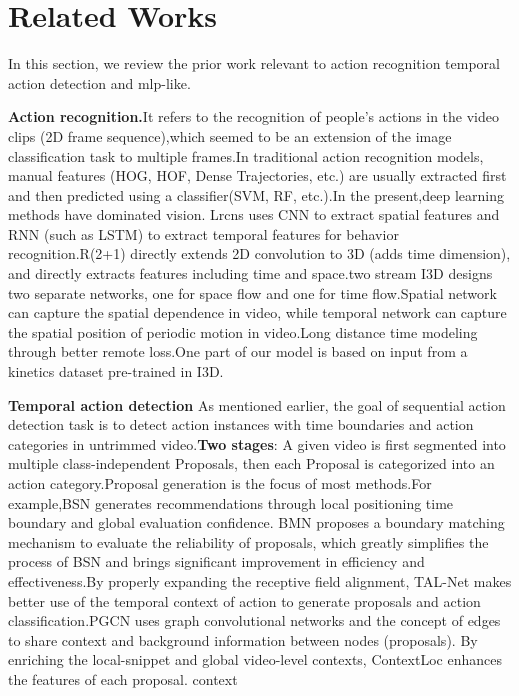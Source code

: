 \documentclass[10pt,twocolumn,letterpaper]{article}
\begin{document}
\section{Related Works}
In this section, we review the prior work relevant to action recognition temporal action detection and mlp-like.

\textbf{Action recognition.}It refers to the recognition of people's actions in the video clips (2D frame sequence),which seemed to be an extension of the image classification task to multiple frames.In traditional action recognition models, manual features (HOG, HOF, Dense Trajectories, etc.) are usually extracted first and then predicted using a classifier(SVM, RF, etc.).In the present,deep learning methods have dominated vision.
Lrcns\cite{donahue2015long} uses CNN to extract spatial features and RNN (such as LSTM) to extract temporal features for behavior recognition.R(2+1)\cite{tran2018closer} directly extends 2D convolution to 3D (adds time dimension), and directly extracts features including time and space.two stream I3D\cite{carreira2017quo} designs two separate networks, one for space flow and one for time flow.Spatial network can capture the spatial dependence in video, while temporal network can capture the spatial position of periodic motion in video.Long distance time modeling through better remote loss.One part of our model is based on input from a kinetics dataset pre-trained in I3D.

\textbf{Temporal action detection}
As mentioned earlier, the goal of sequential action detection task is to detect action instances with time boundaries and action categories in untrimmed video.\textbf{Two stages}: A given video is first segmented into multiple class-independent Proposals, then each Proposal is categorized into an action category.Proposal generation is the focus of most methods.For example,BSN\cite{lin2018bsn} generates recommendations through local positioning time boundary and global evaluation confidence. BMN\cite{lin2019bmn} proposes a boundary matching mechanism to evaluate the reliability of proposals, which greatly simplifies the process of BSN and brings significant improvement in efficiency and effectiveness.By properly expanding the receptive field alignment, TAL-Net\cite{chao2018rethinking} makes better use of the temporal context of action to generate proposals and action classification.PGCN\cite{zeng2019graph} uses graph convolutional networks and the concept of edges to share context and background information between  nodes (proposals).
By enriching the local-snippet and global video-level contexts, ContextLoc\cite{zhu2021enriching} enhances the features of each proposal.
context
\end{document}
